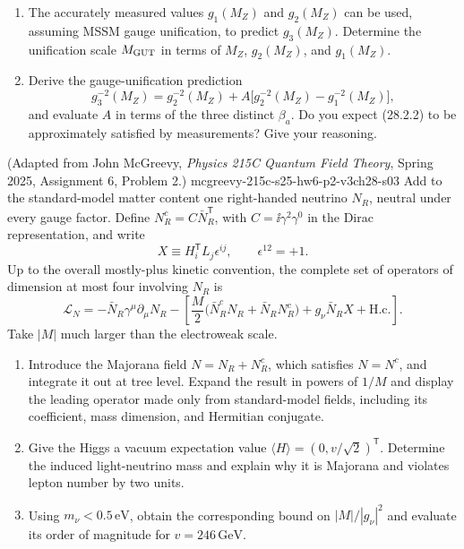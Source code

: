 \begin{enumerate}
\begin{enumerate}
    \item[(c)]
    The accurately measured values \(g_1(M_Z)\) and \(g_2(M_Z)\) can be used,
    assuming MSSM gauge unification, to predict \(g_3(M_Z)\).  Determine the
    unification scale \(M_{\rm GUT}\) in terms of
    \(M_Z\), \(g_2(M_Z)\), and \(g_1(M_Z)\).

    \item[(d)]
    Derive the gauge-unification prediction
    \[
      g_3^{-2}(M_Z)=g_2^{-2}(M_Z)
        +A\bigl[g_2^{-2}(M_Z)-g_1^{-2}(M_Z)\bigr],
      \tag{28.2.2}
    \]
    and evaluate \(A\) in terms of the three distinct \(\beta_a\).  Do you
    expect (28.2.2) to be approximately satisfied by measurements?  Give your
    reasoning.
  \end{enumerate}

    {(Adapted from John McGreevy, \emph{Physics 215C Quantum Field Theory}, Spring 2025, Assignment 6, Problem 2.)}
    {mcgreevy-215c-s25-hw6-p2-v3ch28-s03}
Add to the standard-model matter content one right-handed neutrino
  \(N_R\), neutral under every gauge factor.  Define
  \(N_R^c=C\bar N_R^{\mathsf T}\), with
  \(C=\ii\gamma^2\gamma^0\) in the Dirac representation, and write
  \[
    X\equiv H_i^{\mathsf T}L_j\epsilon^{ij},
    \qquad \epsilon^{12}=+1.
  \]
  Up to the overall mostly-plus kinetic convention, the complete set of
  operators of dimension at most four involving \(N_R\) is
  \[
    \mathcal L_N
      =-\bar N_R\gamma^\mu\partial_\mu N_R
       -\left[
         \frac{M}{2}
          \bigl(\bar N_R^cN_R+\bar N_RN_R^c\bigr)
         +g_\nu\bar N_RX+\mathrm{H.c.}
       \right].
  \]
  Take \(|M|\) much larger than the electroweak scale.
  \begin{enumerate}
    \item Introduce the Majorana field \(N=N_R+N_R^c\), which satisfies
      \(N=N^c\), and integrate it out at tree level.  Expand the result in
      powers of \(1/M\) and display the leading operator made only from
      standard-model fields, including its coefficient, mass dimension, and
      Hermitian conjugate.
    \item Give the Higgs a vacuum expectation value
      \(\langle H\rangle=(0,v/\sqrt2)^{\mathsf T}\).  Determine the induced
      light-neutrino mass and explain why it is Majorana and violates lepton
      number by two units.
    \item Using \(m_\nu<0.5\,\mathrm{eV}\), obtain the corresponding bound on
      \(|M|/|g_\nu|^2\) and evaluate its order of magnitude for
      \(v=246\,\mathrm{GeV}\).
  \end{enumerate}


\end{enumerate}
